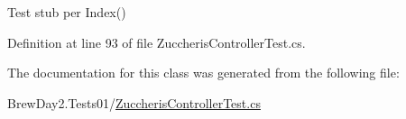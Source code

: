 Test stub per Index()



Definition at line 93 of file Zuccheris\+Controller\+Test.\+cs.



The documentation for this class was generated from the following file\+:\begin{DoxyCompactItemize}
\item 
Brew\+Day2.\+Tests01/\mbox{\hyperlink{1_2_zuccheris_controller_test_8cs}{Zuccheris\+Controller\+Test.\+cs}}\end{DoxyCompactItemize}

